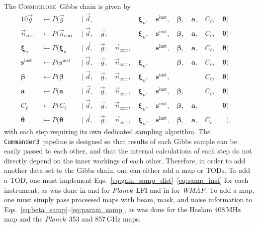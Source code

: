 \documentclass[twocolumn]{../../common/aa}
\def\WMAP{\emph{WMAP}}
\def\Planck{\emph{Planck}}
\def\commanderthree{\texttt{Commander3}}
\newcommand{\g}[0]{\vec{g}}
\newcommand{\cosmoglobe}{\textsc{Cosmoglobe}}
\newcommand{\ncorr}{\vec n_\mathrm{corr}}
\newcommand{\data}{\vec d}
\begin{document}
The \cosmoglobe\ Gibbs chain is given by
\begin{alignat}{10}
\label{eq:gain_samp_dist}\g &\,\leftarrow          P(\g&\,               \mid \data, &\,    &          &\,\boldsymbol\xi_n,  &\,\boldsymbol s^\mathrm{inst}, &\,\boldsymbol\beta, &\,\boldsymbol a, &\,C_{\ell},&\,\boldsymbol\theta)\\
\label{eq:ncorr_samp_dist} \ncorr &\,\leftarrow    P(\ncorr&\,           \mid \data, &\,\g, &\,        &\,\boldsymbol\xi_n,  &\,\boldsymbol s^\mathrm{inst}, &\,\boldsymbol\beta, &\,\boldsymbol a, &\,C_{\ell},&\,\boldsymbol\theta)\\ 
\label{eq:xi_samp_dist} \boldsymbol\xi_n &\,\leftarrow        P(\boldsymbol\xi_n&\,            \mid \data, &\,\g, &\,\ncorr, &\,        &\,\boldsymbol s^\mathrm{inst}, &\,\boldsymbol\beta, &\,\boldsymbol a, &\,C_{\ell},&\,\boldsymbol\theta)\\
\label{eq:samp_inst}\boldsymbol s^\mathrm{inst} &\,\leftarrow                                 P(\boldsymbol s^\mathrm{inst}&\,             \mid \data, &\,\g, &\,\ncorr, &\,\boldsymbol\xi_n,  &\,      &\,\boldsymbol\beta, &\,\boldsymbol a, &\,C_{\ell},&\,\boldsymbol\theta)\\
\label{eq:beta_samp}\boldsymbol\beta &\,\leftarrow                     P(\boldsymbol\beta&\, \mid \data, &\,\g, &\,\ncorr, &\,\boldsymbol\xi_n,  &\,\boldsymbol s^\mathrm{inst}, &\,       &\,    &\,C_{\ell},&\,\boldsymbol\theta)\\
\boldsymbol a &\,\leftarrow                                   P(\boldsymbol a&\,               \mid \data, &\,\g, &\,\ncorr, &\,\boldsymbol\xi_n,  &\,\boldsymbol s^\mathrm{inst}, &\,\boldsymbol\beta, &\,    &\,C_{\ell},&\,\boldsymbol\theta)\\
C_{\ell} &\,\leftarrow                             P(C_{\ell}&\,         \mid \data, &\,\g, &\,\ncorr, &\,\boldsymbol\xi_n,  &\,\boldsymbol s^\mathrm{inst}, &\,\boldsymbol\beta, &\,\boldsymbol a,&\,\phantom{C_{\ell}}&\,\boldsymbol\theta)&\label{eq:cl_sampling}\\
\boldsymbol\theta &\,\leftarrow                             P(\boldsymbol\theta&\,         \mid \data, &\,\g, &\,\ncorr, &\,\boldsymbol\xi_n,  &\,\boldsymbol s^\mathrm{inst}, &\,\boldsymbol\beta, &\,\boldsymbol a,&\,C_\ell\phantom{,}&\,\phantom{\boldsymbol\theta})\label{eq:param_samp},
\end{alignat}
with each step requiring its own dedicated sampling algorithm. The \commanderthree\ pipeline is designed so that results of each Gibbs sample can be easily passed to each other, and that the internal calculations of each step do not directly depend on the inner workings of each other. Therefore, in order to add another data set to the Gibbs chain, one can either add a map or TODs. To add a TOD, one must implement Eqs.~\eqref{eq:gain_samp_dist}--\eqref{eq:samp_inst} for each instrument, as was done in \citet{bp01} and \citet{bp10} for \Planck\ LFI and in \citet{bp17} for \WMAP. To add a map, one must simply pass processed maps with beam, mask, and noise information to Eqs.~\eqref{eq:beta_samp}--\eqref{eq:param_samp}, as was done for the Haslam 408\,MHz map \citep{haslam1982,remazeilles2014} and the \Planck\ 353 and 857\,GHz maps.
\end{document}
